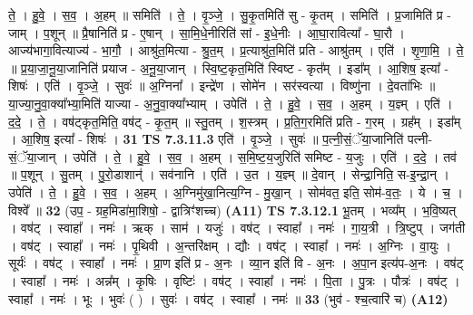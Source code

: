 \documentclass[17pt]{extarticle}
\begin{document}
                  ते॒ । हु॒वे॒ । स॒व॒ । अ॒हम् ॥ समिति॑ । ते॒ । वृ॒ञ्जे॒ । सु॒कृ॒तमिति॑ सु - कृ॒तम् । समिति॑ । प्र॒जामिति॑ प्र - जाम् । प॒शून् ॥ प्रै॒षानिति॑ प्र - ए॒षान् । सा॒मि॒धे॒नीरिति॑ सां - इ॒धे॒नीः । आ॒घा॒रावित्या᳚ - घा॒रौ । आज्य॑भागा॒वित्याज्य॑ - भा॒गौ॒ । आश्रु॑त॒मित्या - श्रु॒त॒म् । प्र॒त्याश्रु॑त॒मिति॑ प्रति - आश्रु॑तम् । एति॑ । शृ॒णा॒मि॒ । ते॒ ॥ प्र॒या॒जा॒नू॒या॒जानिति॑ प्रयाज - अ॒नू॒या॒जान् । स्वि॒ष्ट॒कृत॒मिति॑ स्विष्ट - कृत᳚म् । इडा᳚म् । आ॒शिष॒ इत्या᳚ - शिषः॑ । एति॑ । वृ॒ञ्जे॒ । सुवः॑ ॥ अ॒ग्निना᳚ । इन्द्रे॑ण । सोमे॑न । सर॑स्वत्या । विष्णु॑ना । दे॒वता॑भिः ॥ या॒ज्या॒नु॒वा॒क्या᳚भ्या॒मिति॑ याज्या - अ॒नु॒वा॒क्या᳚भ्याम् । उपेति॑ । ते॒ । हु॒वे॒ । स॒व॒ । अ॒हम् । य॒ज्ञ्म् । एति॑ । द॒दे॒ । ते॒ । वष॑ट्कृत॒मिति॒ वष॑ट् - कृ॒त॒म् ॥ स्तु॒तम् । श॒स्त्रम् । प्र॒ति॒ग॒रमिति॑ प्रति - ग॒रम् । ग्रह᳚म् । इडा᳚म् । आ॒शिष॒ इत्या᳚ - शिषः॑ । \textbf{  31} \newline
                  \newline
                                \textbf{ TS 7.3.11.3} \newline
                  एति॑ । वृ॒ञ्जे॒ । सुवः॑ ॥ प॒त्नी॒सं॒ॅया॒जानिति॑ पत्नी-सं॒ॅया॒जान् । उपेति॑ । ते॒ । हु॒वे॒ । स॒व॒ । अ॒हम् । स॒मि॒ष्ट॒य॒जुरिति॑ समिष्ट - य॒जुः । एति॑ । द॒दे॒ । तव॑ ॥ प॒शून् । सु॒तम् । पु॒रो॒डाशान्॑ । सव॑नानि । एति॑ । उ॒त । य॒ज्ञ्म् ॥ दे॒वान् । सेन्द्रा॒निति॒ स-इ॒न्द्रा॒न् । उपेति॑ । ते॒ । हु॒वे॒ । स॒व॒ । अ॒हम् । अ॒ग्निमु॑खा॒नित्य॒ग्नि - मु॒खा॒न् । सोम॑वत॒ इति॒ सोम॑-व॒तः॒ । ये । च॒ । विश्वे᳚ ॥ \textbf{  32 } \newline
                  \newline
                      (उप॒ - ग्रह॒मिडा॑मा॒शिषो॒ - द्वात्रिꣳ॑शच्च)  \textbf{(A11)} \newline \newline
                                \textbf{ TS 7.3.12.1} \newline
                  भू॒तम् । भव्य᳚म् । भ॒वि॒ष्यत् । वष॑ट् । स्वाहा᳚ । नमः॑ । ऋक् । साम॑ । यजुः॑ । वष॑ट् । स्वाहा᳚ । नमः॑ । गा॒य॒त्री । त्रि॒ष्टुप् । जग॑ती । वष॑ट् । स्वाहा᳚ । नमः॑ । पृ॒थिवी । अ॒न्तरि॑क्षम् । द्यौः । वष॑ट् । स्वाहा᳚ । नमः॑ । अ॒ग्निः । वा॒युः । सूर्यः॑ । वष॑ट् । स्वाहा᳚ । नमः॑ । प्रा॒ण इति॑ प्र - अ॒नः । व्या॒न इति॑ वि - अ॒नः । अ॒पा॒न इत्य॑प-अ॒नः । वष॑ट् । स्वाहा᳚ । नमः॑ । अन्न᳚म् । कृ॒षिः । वृष्टिः॑ । वष॑ट् । स्वाहा᳚ । नमः॑ । पि॒ता । पु॒त्रः । पौत्रः॑ । वष॑ट् । स्वाहा᳚ । नमः॑ । भूः । भुवः॑ ( ) । सुवः॑ । वष॑ट् । स्वाहा᳚ । नमः॑ ॥ \textbf{  33 } \newline
                  \newline
                      (भुव॑ - श्च॒त्वारि॑ च)  \textbf{(A12)} \newline \newline
\end{document}
